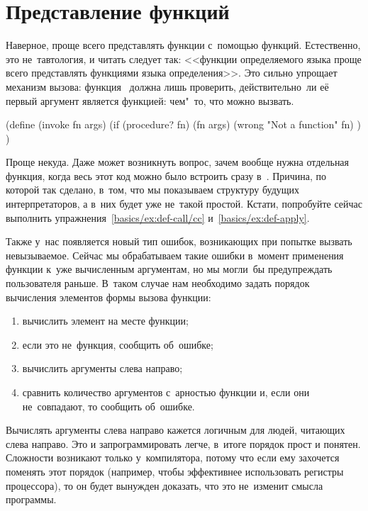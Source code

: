 \section{Представление функций}\label{basics/sect:representing-functions}

Наверное, проще всего представлять функции с~помощью функций. Естественно, это
не~тавтология, и читать следует так: <<функции определяемого языка проще всего
представлять функциями языка определения>>. Это сильно упрощает механизм вызова:
функция~ должна лишь проверить, действительно~ли её первый аргумент
является функцией: чем"~то, что можно вызвать.

\begin{code:lisp}
(define (invoke fn args)
  (if (procedure? fn) (fn args)
      (wrong "Not a function" fn) ) )
\end{code:lisp}

Проще некуда. Даже может возникнуть вопрос, зачем вообще нужна отдельная
функция, когда весь этот код можно было встроить сразу в~. Причина,
по которой так сделано, в~том, что мы показываем структуру будущих
интерпретаторов, а в~них  будет уже не~такой простой. Кстати,
попробуйте сейчас выполнить упражнения~\ref{basics/ex:def-call/cc}
и~\ref{basics/ex:def-apply}.

Также у~нас появляется новый тип ошибок, возникающих при попытке вызвать
невызываемое. Сейчас мы обрабатываем такие ошибки в~момент применения функции
к~уже вычисленным аргументам, но мы могли~бы предупреждать пользователя раньше.
В~таком случае нам необходимо задать порядок вычисления элементов формы вызова
функции:

\begin{enumerate}
  \item вычислить элемент на месте функции;
  
  \item если это не~функция, сообщить об~ошибке;
  
  \item вычислить аргументы слева направо;
  
  \item сравнить количество аргументов с~арностью функции
        и, если они не~совпадают, то сообщить об~ошибке.
\end{enumerate}

Вычислять аргументы слева направо кажется логичным для людей, читающих слева
направо. Это и запрограммировать легче, в~итоге порядок прост и понятен.
Сложности возникают только у~компилятора, потому что если ему захочется поменять
этот порядок (например, чтобы эффективнее использовать регистры процессора), то
он будет вынужден доказать, что это не~изменит смысла программы.

